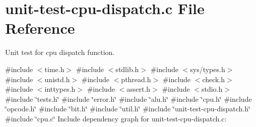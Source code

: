 \hypertarget{unit-test-cpu-dispatch_8c}{}\section{unit-\/test-\/cpu-\/dispatch.c File Reference}
\label{unit-test-cpu-dispatch_8c}


Unit test for cpu dispatch function.  


{\ttfamily \#include $<$time.\+h$>$}\newline
{\ttfamily \#include $<$stdlib.\+h$>$}\newline
{\ttfamily \#include $<$sys/types.\+h$>$}\newline
{\ttfamily \#include $<$unistd.\+h$>$}\newline
{\ttfamily \#include $<$pthread.\+h$>$}\newline
{\ttfamily \#include $<$check.\+h$>$}\newline
{\ttfamily \#include $<$inttypes.\+h$>$}\newline
{\ttfamily \#include $<$assert.\+h$>$}\newline
{\ttfamily \#include $<$stdio.\+h$>$}\newline
{\ttfamily \#include \char`\"{}tests.\+h\char`\"{}}\newline
{\ttfamily \#include \char`\"{}error.\+h\char`\"{}}\newline
{\ttfamily \#include \char`\"{}alu.\+h\char`\"{}}\newline
{\ttfamily \#include \char`\"{}cpu.\+h\char`\"{}}\newline
{\ttfamily \#include \char`\"{}opcode.\+h\char`\"{}}\newline
{\ttfamily \#include \char`\"{}bit.\+h\char`\"{}}\newline
{\ttfamily \#include \char`\"{}util.\+h\char`\"{}}\newline
{\ttfamily \#include \char`\"{}unit-\/test-\/cpu-\/dispatch.\+h\char`\"{}}\newline
{\ttfamily \#include \char`\"{}cpu.\+c\char`\"{}}\newline
Include dependency graph for unit-\/test-\/cpu-\/dispatch.c\+:
